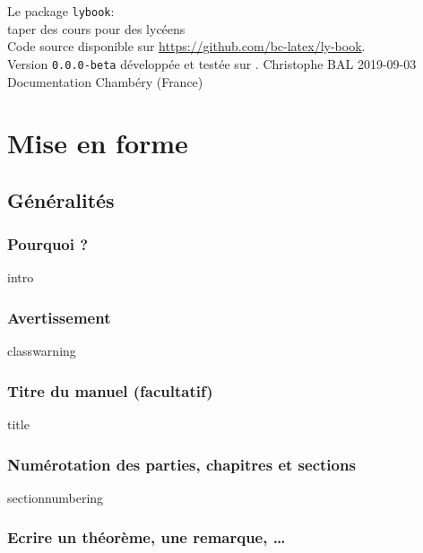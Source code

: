 \documentclass[14pt]{memoir}
\begin{document}
\buildfront
	{
		Le package \texttt{lybook}:
		\\
		taper des cours pour des lycéens
		\\
		{
			\footnotesize Code source disponible sur 
			\url{https://github.com/bc-latex/ly-book}.
		}
		\\
		{
			\footnotesize Version \texttt{0.0.0-beta} développée 
			et testée sur \macosxname{}.
		}
	}
	{Christophe BAL}%
	{2019-09-03}
	{Documentation}
	{Chambéry (France)}



\part{Mise en forme}

\chapter{Généralités}

\section{Pourquoi ?}

{intro}




\section{Avertissement}

{classwarning}




\section{Titre du manuel (facultatif)}

{title}




\section{Numérotation des parties, chapitres et sections}

{sectionnumbering}




\section{Ecrire un théorème, une remarque, \dots}
\end{document}
